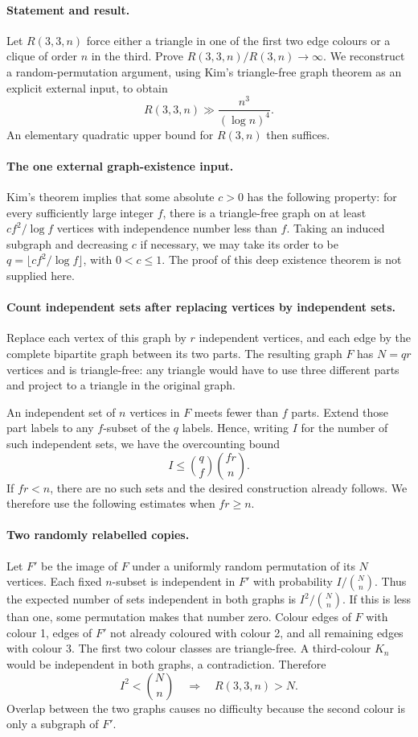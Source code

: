 \paragraph{Statement and result.}
Let \(R(3,3,n)\) force either a triangle in one of the first two
edge colours or a clique of order \(n\) in the third. Prove
\(R(3,3,n)/R(3,n)\to\infty\).
We reconstruct a random-permutation argument, using Kim's
triangle-free graph theorem as an explicit external input, to obtain
\[
 R(3,3,n)\gg \frac{n^3}{(\log n)^4}. \tag{1}
\]
An elementary quadratic upper bound for \(R(3,n)\) then suffices.

\paragraph{The one external graph-existence input.}
Kim's theorem implies that some absolute \(c>0\) has the following
property: for every sufficiently large integer \(f\), there is a
triangle-free graph on at least \(cf^2/\log f\) vertices with
independence number less than \(f\).
Taking an induced subgraph and decreasing \(c\) if necessary, we may
take its order to be \(q=\lfloor cf^2/\log f\rfloor\), with \(0<c\leq1\).
The proof of this deep existence theorem is not supplied here.

\paragraph{Count independent sets after replacing vertices by independent sets.}
Replace each vertex of this graph by \(r\) independent vertices,
and each edge by the complete bipartite graph between its two parts.
The resulting graph \(F\) has \(N=qr\) vertices and is triangle-free:
any triangle would have to use three different parts and project to
a triangle in the original graph.

An independent set of \(n\) vertices in \(F\) meets fewer than
\(f\) parts. Extend those part labels to any \(f\)-subset of the
\(q\) labels. Hence, writing \(I\) for the number of such independent
sets, we have the overcounting bound
\[
 I\leq\binom qf\binom{fr}{n}. \tag{2}
\]
If \(fr<n\), there are no such sets and the desired construction
already follows. We therefore use the following estimates when
\(fr\geq n\).

\paragraph{Two randomly relabelled copies.}
Let \(F'\) be the image of \(F\) under a uniformly random permutation
of its \(N\) vertices. Each fixed \(n\)-subset is independent in
\(F'\) with probability \(I/\binom Nn\).
Thus the expected number of sets independent in both graphs is
\(I^2/\binom Nn\). If this is less than one, some permutation makes
that number zero.
Colour edges of \(F\) with colour 1, edges of \(F'\) not already
coloured with colour 2, and all remaining edges with colour 3.
The first two colour classes are triangle-free. A third-colour
\(K_n\) would be independent in both graphs, a contradiction.
Therefore
\[
 I^2<\binom Nn\quad\Longrightarrow\quad R(3,3,n)>N. \tag{3}
\]
Overlap between the two graphs causes no difficulty because the
second colour is only a subgraph of \(F'\).

